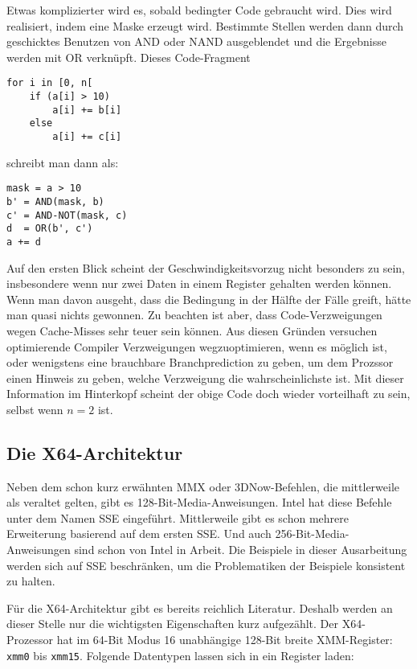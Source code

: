 \documentclass[a4paper,10pt]{article}
\begin{document}
Etwas komplizierter wird es, sobald bedingter Code gebraucht wird. Dies wird realisiert, indem eine
Maske erzeugt wird. Bestimmte Stellen werden dann durch geschicktes Benutzen von AND oder NAND
ausgeblendet und die Ergebnisse werden mit OR verknüpft. Dieses Code-Fragment

\begin{verbatim}
for i in [0, n[
    if (a[i] > 10)
        a[i] += b[i]
    else
        a[i] += c[i]
\end{verbatim}
    
schreibt man dann als:

\begin{verbatim}
mask = a > 10
b' = AND(mask, b)
c' = AND-NOT(mask, c)
d  = OR(b', c')
a += d
\end{verbatim}

Auf den ersten Blick scheint der Geschwindigkeitsvorzug nicht besonders zu sein, insbesondere wenn
nur zwei Daten in einem Register gehalten werden können. Wenn man davon ausgeht, dass die Bedingung
in der Hälfte der Fälle greift, hätte man quasi nichts gewonnen. Zu beachten ist aber, dass
Code-Verzweigungen wegen Cache-Misses sehr teuer sein können. Aus diesen Gründen versuchen
optimierende Compiler Verzweigungen wegzuoptimieren, wenn es möglich ist, oder wenigstens eine
brauchbare Branchprediction zu geben, um dem Prozssor einen Hinweis zu geben, welche Verzweigung die
wahrscheinlichste ist. Mit dieser Information im Hinterkopf scheint der obige Code doch wieder
vorteilhaft zu sein, selbst wenn $n = 2$ ist.

\subsection{Die X64-Architektur}

Neben dem schon kurz erwähnten MMX oder 3DNow-Befehlen, die mittlerweile als veraltet gelten, gibt
es 128-Bit-Media-Anweisungen. Intel hat diese Befehle unter dem Namen SSE eingeführt.  Mittlerweile
gibt es schon mehrere Erweiterung basierend auf dem ersten SSE. Und auch 256-Bit-Media-Anweisungen
sind schon von Intel in Arbeit. Die Beispiele in dieser Ausarbeitung werden sich auf SSE
beschränken, um die Problematiken der Beispiele konsistent zu halten.

Für die X64-Architektur gibt es bereits reichlich Literatur. Deshalb werden an dieser Stelle nur die
wichtigsten Eigenschaften kurz aufgezählt. Der X64-Prozessor hat im 64-Bit Modus 16 unabhängige
128-Bit breite XMM-Register: \texttt{xmm0} bis \texttt{xmm15}. Folgende Datentypen lassen sich in
ein Register laden:
\end{document}
